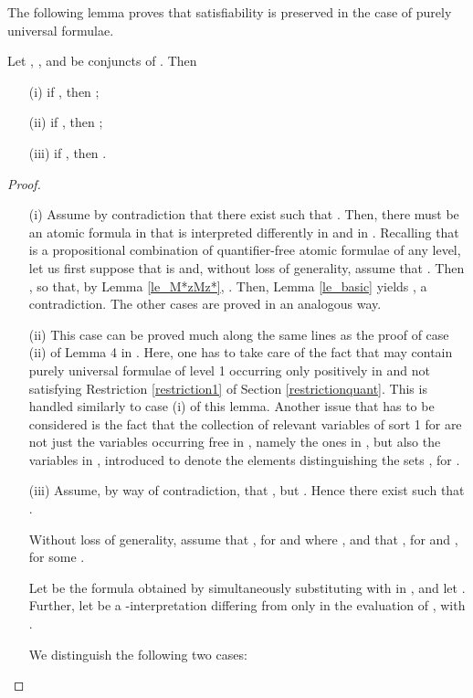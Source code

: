 \documentclass{fundam}
\begin{document}
The following lemma proves that satisfiability is preserved in the case of purely universal formulae.
\begin{lemma}\label{quantifiedform}
Let , , and  be conjuncts of .  Then
\begin{itemize}
\item [(i)] if , then ;

\item [(ii)] if , then ;
\item [(iii)] if , then .
\end{itemize}
\end{lemma}
\begin{proof}
\begin{itemize}
\item [(i)]
Assume by contradiction that there exist 
such that .
Then, there must be an atomic formula  in  that
is interpreted differently in  and in .
Recalling that  is a propositional combination of
quantifier-free atomic formulae of any level, let us first suppose
that  is  and, without loss of generality,
assume that .  Then , so that, by Lemma \ref{le_M*zMz*}, .  Then, Lemma \ref{le_basic} yields ,
a contradiction.  The other cases are proved in an analogous way.

\item [(ii)] This case can be proved much along the same lines as the
proof of case (ii) of Lemma 4 in \cite{CanNic08}.  Here, one has to take
care of the fact that  may contain purely universal
formulae of level 1 occurring only positively in  and not
satisfying Restriction \ref{restriction1} of Section
\ref{restrictionquant}.  This is handled similarly to case (i)
of this lemma.  Another issue that has to be considered is the fact
that the collection of relevant variables of sort 1 for  are not
just the variables occurring free in , namely the ones in , but also the variables in , introduced to
denote the elements distinguishing the sets , for .


\item [(iii)]
Assume, by way of contradiction, that
,
but
. Hence there exist  such that .

Without loss of generality, assume that , for  and where , and
that , for  and
, for some .

Let  be the formula obtained by simultaneously
substituting  with  in
, and let .  Further, let
 be a -interpretation differing from
 only in the evaluation of , with
.

We distinguish the following two cases:


\end{itemize}
\end{proof}
\end{document}
